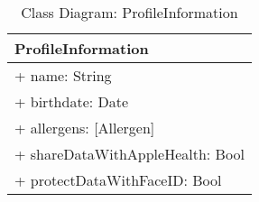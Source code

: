 \begin{table}[H]
\centering
\caption{Class Diagram: ProfileInformation}

\hspace{1em}
\renewcommand{\arraystretch}{1.7}

\begin{tabular}{|l|}
\hline
\textbf{ProfileInformation} \\
\hline
+ name: String \\
+ birthdate: Date \\
+ allergens: [Allergen] \\
+ shareDataWithAppleHealth: Bool \\
+ protectDataWithFaceID: Bool \\
\hline
\end{tabular}
\end{table}
